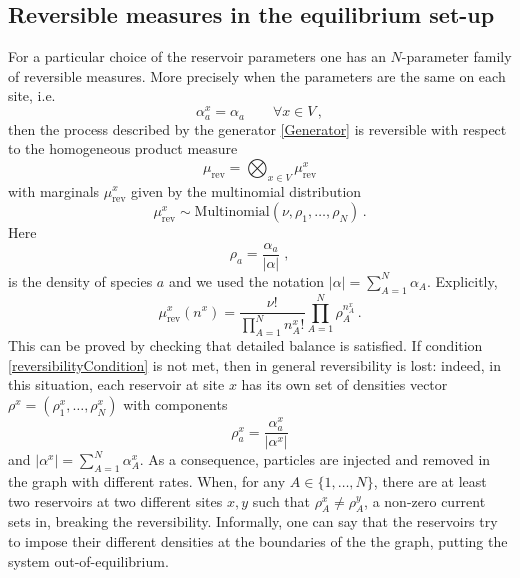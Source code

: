 \documentclass[10pt]{article}
\numberwithin{equation}{section}
\numberwithin{equation}{subsection}
\newcommand{\co}{\;,}
\newcommand{\twoj}{\nu}
\begin{document}
\subsection{Reversible measures in the equilibrium set-up}
For a particular choice of the reservoir parameters one has an $N$-parameter family of reversible measures. More precisely
when the parameters are the same on each site, i.e.
\begin{equation}\label{reversibilityCondition}
\alpha_{a}^{x}=\alpha_{a}\qquad \forall x\in V\,,
\end{equation}
then the process described by the generator \eqref{Generator} is reversible with respect to the 
homogeneous product measure 
\begin{equation}
\label{reversibleMeasure}
\mu_{\text{rev}}=\bigotimes_{x\in V}\mu_{\text{rev}}^{x}
\end{equation}
with marginals $\mu_{\text{rev}}^{x}$ given by  the multinomial distribution
\begin{equation}
 \mu^{x}_{\text{rev}}\sim \text{Multinomial}\left(\twoj,\rho_{1},\ldots,\rho_{N}\right)\,.
\end{equation}
Here
 $$
\rho_{a}=\frac{\alpha_{a}}{|\alpha|}\co
$$
is the density of species $a$ and we used the notation $|\alpha|=\sum_{A=1}^{N}\alpha_{A}$. Explicitly, 
\begin{equation}
\mu_{\text{rev}}^{x}(n^{x})=\frac{\nu!}{\prod_{A=1}^{N}n_{A}^{x}!}\prod_{A=1}^{N}\rho_{A}^{n_{A}^{x}}\,.
\end{equation}
This can be proved  by checking that detailed balance is satisfied. 
If condition \eqref{reversibilityCondition} is not met, then in general reversibility is lost: indeed, in this situation, each reservoir at site $x$ has  its own set of densities vector $\rho^{x}=(\rho_{1}^{x},\ldots,\rho_{N}^{x})$ with components
\begin{equation}
	\label{rhox}
	\rho_{a}^x=\frac{\alpha_{a}^x}{|\alpha^x|}
\end{equation}
and  $|\alpha^x|=\sum_{A=1}^{N}\alpha_{A}^x$. {\color{blue} As a consequence, particles are injected and removed in the graph with different rates. When, for any $A\in \{1,\ldots,N\}$, there are at least two reservoirs at two different sites $x,y$ such that $\rho_{A}^{x}\neq  \rho_{A}^{y}$, a  non-zero current sets in, breaking the reversibility. Informally, one can say that the reservoirs try to impose their different densities at the boundaries of the the graph, putting the system out-of-equilibrium.} %
\end{document}
